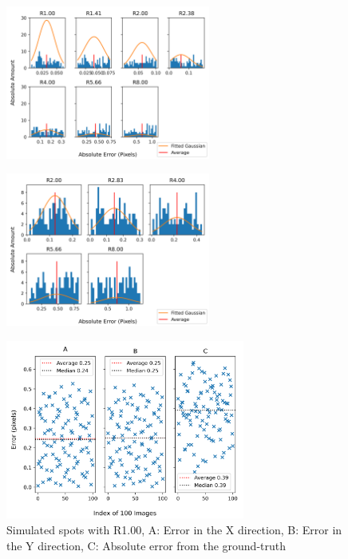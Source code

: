 \documentclass[aps,pra,a4paper,nofootinbib,onecolumn,tightenlines,longbibliography,12pt,amsfonts,amssymb,amsmath,floatfix]{revtex4-2} %
\begin{document}
  \begin{figure}[H]
    \begin{center}
      \includegraphics[width=0.6\textwidth]{project_pics/distro_centriod_7.png}
    \end{center}
    \caption{}
    \label{fig:box_7}
  \end{figure}

  \begin{figure}[H]
    \begin{center}
      \includegraphics[width=0.6\textwidth]{project_pics/noise_cen_scatter_7.png}
    \end{center}
    \caption{}
    \label{fig:box_7_noise}
  \end{figure}

  \begin{figure}[H]
      \begin{center}
        \includegraphics[width=0.7\textwidth]{project_pics/single_test.png}
      \end{center}
      \caption{Simulated spots with R1.00, A: Error in the X direction, B: Error in the Y direction, C: Absolute error from the ground-truth}
      \label{fig:single_test}
    \end{figure}
\end{document}
